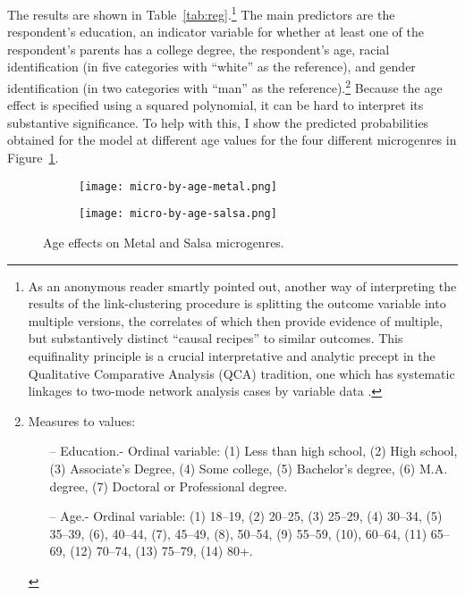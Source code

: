 \documentclass[a4paper,12pt]{article}
\begin{document}
The results are shown in Table~\ref{tab:reg}.\footnote{As an anonymous reader smartly pointed out, another way of interpreting the results of the link-clustering procedure is splitting the outcome variable into multiple versions, the correlates of which then provide evidence of multiple, but substantively distinct ``causal recipes'' to similar outcomes. This equifinality principle is a crucial interpretative and analytic precept in the Qualitative Comparative Analysis (QCA) tradition, one which has systematic linkages to two-mode network analysis cases by variable data \citep{breiger2014comparative}.} The main predictors are the respondent's education, an indicator variable for whether at least one of the respondent's parents has a college degree, the respondent's age, racial identification (in five categories with ``white'' as the reference), and gender identification (in two categories with ``man'' as the reference).\footnote{Measures to values:
    \begin{itemize}
        \item[--] Education.- Ordinal variable: (1) Less than high school, (2) High school, (3) Associate's Degree, (4) Some college, (5) Bachelor's degree, (6) M.A. degree, (7) Doctoral or Professional degree.
        \item[--] Age.- Ordinal variable: (1) 18--19, (2) 20--25, (3) 25--29, (4) 30--34, (5) 35--39, (6), 40--44, (7), 45--49, (8), 50--54, (9) 55--59, (10), 60--64, (11) 65--69, (12) 70--74, (13) 75--79, (14) 80+.
    \end{itemize}}
Because the age effect is specified using a squared polynomial, it can be hard to interpret its substantive significance. To help with this, I show the predicted probabilities obtained for the model at different age values for the four different microgenres in Figure~\ref{fig:age-metal}.

\begin{figure}[t!]
     \begin{subfigure}[b]{0.45\textwidth}
        \centering    
        \texttt{[image: micro-by-age-metal.png]}
        \caption{}
        \label{fig:age-metal}
    \end{subfigure}
     \begin{subfigure}[b]{0.45\textwidth}
        \centering    
        \texttt{[image: micro-by-age-salsa.png]}
        \caption{}
        \label{fig:age-salsa}
    \end{subfigure}
    \caption{Age effects on Metal and Salsa microgenres.}
\end{figure}
\end{document}
